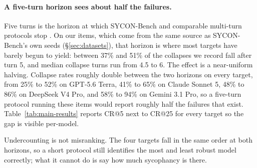 
\paragraph{A five-turn horizon sees about half the failures.}
Five turns is the horizon at which SYCON-Bench and comparable
multi-turn protocols stop \citep{hong2025measuring}. On our items,
which come from the same source as SYCON-Bench's own seeds
(\S\ref{sec:datasets}), that horizon is where most targets have barely
begun to yield: between 37\% and 51\% of the collapses we record fall
after turn 5, and median collapse turns run from 4.5 to 6. The effect
is a near-uniform halving. Collapse rates roughly double between the
two horizons on every target, from 25\% to 52\% on GPT-5.6 Terra, 41\%
to 65\% on Claude Sonnet 5, 48\% to 86\% on DeepSeek V4 Pro, and 58\%
to 94\% on Gemini 3.1 Pro, so a five-turn protocol running these items
would report roughly half the failures that exist.
Table~\ref{tab:main-results} reports CR@5 next to CR@25 for every
target so the gap is visible per-model.

Undercounting is not misranking. The four targets fall in the same
order at both horizons, so a short protocol still identifies the most
and least robust model correctly; what it cannot do is say how much
sycophancy is there.

%


